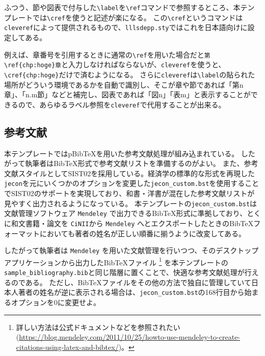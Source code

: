 				ふつう、節や図表で付与した\verb|\label|を\verb|\ref|コマンドで参照するところ、本テンプレートでは\verb|\cref|を使うと記述が楽になる。
				この\verb|\cref|というコマンドは\texttt{cleveref}によって提供されるもので、\texttt{lllsdepp.sty}ではこれを日本語向けに設定してある。

				例えば、章番号を引用するときに通常の\verb|\ref|を用いた場合だと\verb|第\ref{chp:hoge}章|と入力しなければならないが、\texttt{cleveref}を使うと、\verb|\cref{chp:hoge}|だけで済むようになる。
				さらに\texttt{cleveref}は\verb|\label|の貼られた場所がどういう環境であるかを自動で識別し、そこが章や節であれば「第n章」、「n.m節」などと補完し、図表であれば「図n」「表m」と表示することができるので、あらゆるラベル参照を\texttt{cleveref}で代用することが出来る。


			\subsection{参考文献}
				\label{sub:bibtex}

				本テンプレートではpBibTeXを用いた参考文献処理が組み込まれている。
				したがって執筆者はBibTeX形式で参考文献リストを準備するのがよい。
				また、参考文献スタイルとしてSIST02を採用している。経済学の標準的な形式を再現した \texttt{jecon}を元にいくつかのオプションを変更した\texttt{jecon\_custom.bst}を使用することでSIST02のサポートを実現しており、和書・洋書が混在した参考文献リストが見やすく出力されるようになっている。
				本テンプレートの\texttt{jecon\_custom.bst}は文献管理ソフトウェア \texttt{Mendeley} で出力できるBibTeX形式に準拠しており、とくに和文書籍・論文を \texttt{CiNII}から \texttt{Mendeley} へとエクスポートしたときのBibTeXフォーマットにおいても著者の姓名が正しい順番に揃うように改変してある。

				したがって執筆者は \texttt{Mendeley} を用いた文献管理を行いつつ、そのデスクトップアプリケーションから出力したBibTeXファイル
				\footnote{詳しい方法は公式ドキュメントなどを参照されたい
				(\url{https://blog.mendeley.com/2011/10/25/howto-use-mendeley-to-create-citations-using-latex-and-bibtex/})。}
				を本テンプレートの\texttt{sample\_bibliography.bib}と同じ階層に置くことで、快適な参考文献処理が行えるのである。
				ただし、BibTeXファイルをその他の方法で独自に管理していて日本人著者の姓名が逆に表示される場合は、\verb|jecon_custom.bst|の168行目から始まるオプションを0に変更せよ。

